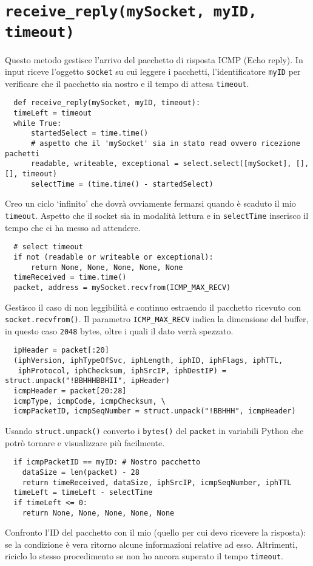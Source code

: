 \documentclass[a4paper,12pt]{report}
\begin{document}
\section{\texttt{receive\_reply(mySocket, myID, timeout)}}
Questo metodo gestisce l'arrivo del pacchetto di risposta ICMP (Echo reply).
%
In input riceve l'oggetto \texttt{socket} su cui leggere i pacchetti, l'identificatore \texttt{myID} per verificare che il pacchetto sia nostro e il tempo di attesa \texttt{timeout}.
%
\begin{verbatim}
  def receive_reply(mySocket, myID, timeout):
  timeLeft = timeout
  while True:
      startedSelect = time.time()
      # aspetto che il 'mySocket' sia in stato read ovvero ricezione pachetti
      readable, writeable, exceptional = select.select([mySocket], [], [], timeout)
      selectTime = (time.time() - startedSelect)
\end{verbatim}
Creo un ciclo `infinito' che dovrà ovviamente fermarsi quando è scaduto il mio \texttt{timeout}.
%
Aspetto che il socket sia in modalità lettura e in \texttt{selectTime} inserisco il tempo che ci ha messo ad attendere.
\begin{verbatim}
  # select timeout
  if not (readable or writeable or exceptional):
      return None, None, None, None, None 
  timeReceived = time.time()
  packet, address = mySocket.recvfrom(ICMP_MAX_RECV)
\end{verbatim}
Gestisco il caso di non leggibilità e continuo estraendo il pacchetto ricevuto con \texttt{socket.recvfrom()}.
%
Il parametro \texttt{ICMP\_MAX\_RECV} indica la dimensione del buffer, in questo caso \texttt{2048} bytes, oltre i quali il dato verrà spezzato.
\begin{verbatim}
  ipHeader = packet[:20]
  (iphVersion, iphTypeOfSvc, iphLength, iphID, iphFlags, iphTTL,
   iphProtocol, iphChecksum, iphSrcIP, iphDestIP) = struct.unpack("!BBHHHBBHII", ipHeader)
  icmpHeader = packet[20:28]
  icmpType, icmpCode, icmpChecksum, \
  icmpPacketID, icmpSeqNumber = struct.unpack("!BBHHH", icmpHeader)
\end{verbatim}
Usando \texttt{struct.unpack()} converto i \texttt{bytes()} del \texttt{packet} in variabili Python che potrò tornare e visualizzare più facilmente.
%
\begin{verbatim}
  if icmpPacketID == myID: # Nostro pacchetto
    dataSize = len(packet) - 28
    return timeReceived, dataSize, iphSrcIP, icmpSeqNumber, iphTTL
  timeLeft = timeLeft - selectTime
  if timeLeft <= 0:
    return None, None, None, None, None
\end{verbatim}
Confronto l'ID del pacchetto con il mio (quello per cui devo ricevere la risposta): se la condizione è vera ritorno alcune informazioni relative ad esso.
%
Altrimenti, riciclo lo stesso procedimento se non ho ancora superato il tempo \texttt{timeout}.
\end{document}
